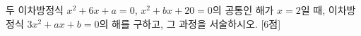 두 이차방정식 $x^2+6x+a=0$, $x^2+bx+20=0$의 공통인 해가 $x=2$일 때, 이차방정식 $3x^2+ax+b=0$의 해를 구하고, 그 과정을 서술하시오.  \mbox{[6점]}

